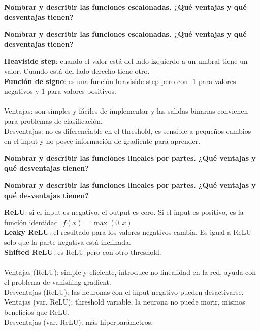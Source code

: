 \documentclass[10pt]{memoir}
\begin{document}
\clearpage
\begin{center}
	\textbf{\Large Nombrar y describir las funciones escalonadas. ¿Qué ventajas y qué desventajas tienen?}
\end{center}

\clearpage
\begin{center}
	\textbf{\Large Nombrar y describir las funciones escalonadas. ¿Qué ventajas y qué desventajas tienen?} \\
\end{center}
\noindent \textbf{Heaviside step}: cuando el valor está del lado izquierdo a un umbral tiene un valor. Cuando está del lado derecho tiene otro. \\
\textbf{Función de signo}: es una función heaviside step pero con -1 para valores negativos y 1 para valores positivos. \\
\\
Ventajas: son simples y fáciles de implementar y las salidas binarias convienen para problemas de clasificación. \\
Desventajas: no es diferenciable en el threshold, es sensible a pequeños cambios en el input y no posee información de gradiente para aprender.

\clearpage
\begin{center}
	\textbf{\Large Nombrar y describir las funciones lineales por partes. ¿Qué ventajas y qué desventajas tienen?}
\end{center}

\clearpage
\begin{center}
	\textbf{\Large Nombrar y describir las funciones lineales por partes. ¿Qué ventajas y qué desventajas tienen?}
\end{center}
\noindent \textbf{ReLU}: si el input es negativo, el output es cero. Si el input es positivo, es la función identidad. \(f(x) = \max (0, x)\) \\
\textbf{Leaky ReLU}: el resultado para los valores negativos cambia. Es igual a ReLU solo que la parte negativa está inclinada. \\
\textbf{Shifted ReLU}: es ReLU pero con otro threshold. \\
\\
\noindent Ventajas (ReLU): simple y eficiente, introduce no linealidad en la red, ayuda con el problema de vanishing gradient. \\
Desventajas (ReLU): las neuronas con el input negativo pueden desactivarse. \\
Ventajas (var. ReLU): threshold variable, la neurona no puede morir, mismos beneficios que ReLU. \\
Desventajas (var. ReLU): más hiperparámetros.
\end{document}
